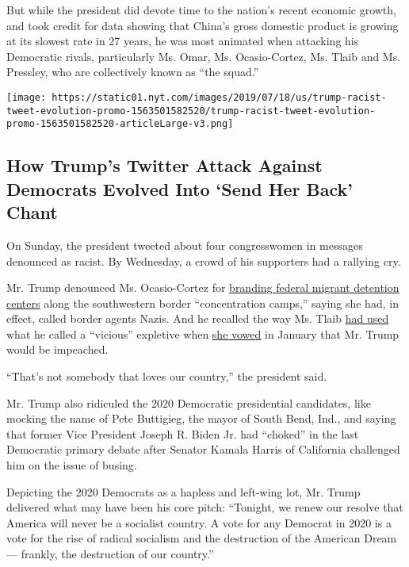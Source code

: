But while the president did devote time to the nation's recent economic
growth, and took credit for data showing that China's gross domestic
product is growing at its slowest rate in 27 years, he was most animated
when attacking his Democratic rivals, particularly Ms. Omar, Ms.
Ocasio-Cortez, Ms. Tlaib and Ms. Pressley, who are collectively known as
``the squad.''

\href{https://www.nytimes.com/interactive/2019/07/18/us/politics/trump-racist-tweet-evolution.html}{}

\texttt{[image: https://static01.nyt.com/images/2019/07/18/us/trump-racist-tweet-evolution-promo-1563501582520/trump-racist-tweet-evolution-promo-1563501582520-articleLarge-v3.png]}

\hypertarget{how-trumps-twitter-attack-against-democrats-evolved-into-send-her-back-chant}{%
\subsection{How Trump's Twitter Attack Against Democrats Evolved Into
`Send Her Back'
Chant}\label{how-trumps-twitter-attack-against-democrats-evolved-into-send-her-back-chant}}

On Sunday, the president tweeted about four congresswomen in messages
denounced as racist. By Wednesday, a crowd of his supporters had a
rallying cry.

Mr. Trump denounced Ms. Ocasio-Cortez for
\href{https://www.nytimes.com/2019/06/18/us/politics/ocasio-cortez-cheney-detention-centers.html}{branding
federal migrant detention centers} along the southwestern border
``concentration camps,'' saying she had, in effect, called border agents
Nazis. And he recalled the way Ms. Tlaib
\href{https://www.nytimes.com/2019/01/04/us/politics/tlaib-impeach-trump.html?module=inline}{had
used} what he called a ``vicious'' expletive when
\href{https://www.nytimes.com/2019/01/04/us/politics/tlaib-impeach-trump.html?module=inline}{she
vowed} in January that Mr. Trump would be impeached.

``That's not somebody that loves our country,'' the president said.

Mr. Trump also ridiculed the 2020 Democratic presidential candidates,
like mocking the name of Pete Buttigieg, the mayor of South Bend, Ind.,
and saying that former Vice President Joseph R. Biden Jr. had ``choked''
in the last Democratic primary debate after Senator Kamala Harris of
California challenged him on the issue of busing.

Depicting the 2020 Democrats as a hapless and left-wing lot, Mr. Trump
delivered what may have been his core pitch: ``Tonight, we renew our
resolve that America will never be a socialist country. A vote for any
Democrat in 2020 is a vote for the rise of radical socialism and the
destruction of the American Dream --- frankly, the destruction of our
country.''

